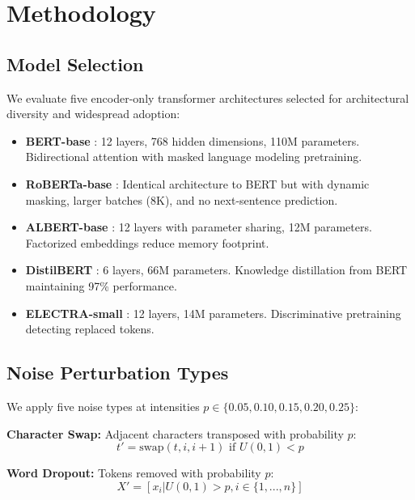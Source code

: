 \section{Methodology}
\label{sec:methodology}

\subsection{Model Selection}

We evaluate five encoder-only transformer architectures selected for architectural diversity and widespread adoption:

\begin{itemize}
\item \textbf{BERT-base} \cite{devlin2019bert}: 12 layers, 768 hidden dimensions, 110M parameters. Bidirectional attention with masked language modeling pretraining.
\item \textbf{RoBERTa-base} \cite{liu2019roberta}: Identical architecture to BERT but with dynamic masking, larger batches (8K), and no next-sentence prediction.
\item \textbf{ALBERT-base} \cite{lan2020albert}: 12 layers with parameter sharing, 12M parameters. Factorized embeddings reduce memory footprint.
\item \textbf{DistilBERT} \cite{sanh2019distilbert}: 6 layers, 66M parameters. Knowledge distillation from BERT maintaining 97\% performance.
\item \textbf{ELECTRA-small} \cite{clark2020electra}: 12 layers, 14M parameters. Discriminative pretraining detecting replaced tokens.
\end{itemize}

\subsection{Noise Perturbation Types}

We apply five noise types at intensities $p \in \{0.05, 0.10, 0.15, 0.20, 0.25\}$:

\textbf{Character Swap:} Adjacent characters transposed with probability $p$:
\begin{equation}
t' = \text{swap}(t, i, i+1) \text{ if } U(0,1) < p
\end{equation}

\textbf{Word Dropout:} Tokens removed with probability $p$:
\begin{equation}
X' = [x_i | U(0,1) > p, i \in \{1, ..., n\}]
\end{equation}

